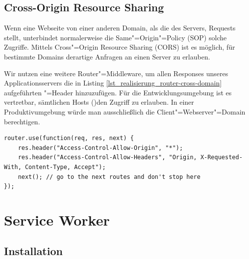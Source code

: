 \newpage
\subsection{Cross-Origin Resource Sharing}

Wenn eine Webseite von einer anderen Domain, als die des Servers, Requests stellt, unterbindet normalerweise die Same"=Origin"=Policy (SOP) solche Zugriffe. Mittels Cross"=Origin Resource Sharing (CORS) ist es möglich, für bestimmte Domains derartige Anfragen an einen Server zu erlauben. 

Wir nutzen eine weitere Router"=Middleware, um allen Responses unseres Applicationsservers die in Listing \ref{lst_realisierung_router-cross-domain} aufgeführten "=Header hinzuzufügen. Für die Entwicklungsumgebung ist es vertretbar, sämtlichen Hosts (\code{(*)})den Zugriff zu erlauben. In einer Produktivumgebung würde man ausschließlich die Client"=Webserver"=Domain berechtigen. \\

\begin{lstlisting}[caption={Router-Middleware um jedem Response die \code{Access-Control}-Header hinzuzufügen},label={lst_realisierung_router-cross-domain}, frame=single]
router.use(function(req, res, next) {
    res.header("Access-Control-Allow-Origin", "*");
    res.header("Access-Control-Allow-Headers", "Origin, X-Requested-With, Content-Type, Accept");
    next(); // go to the next routes and don't stop here
});
\end{lstlisting}

\section{Service Worker}
\label{sec_realisierung_serviceworker}

\subsection{Installation}

